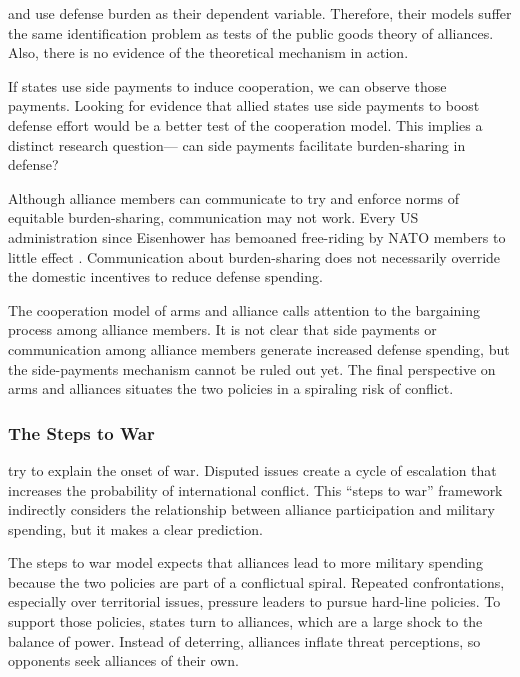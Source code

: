 \documentclass[12pt]{article}
\begin{document}
\citet{Palmer1990} and \citet{QuirozFlores2011} use defense burden as their dependent variable.
Therefore, their models suffer the same identification problem as tests of the public goods theory of alliances. 
Also, there is no evidence of the theoretical mechanism in action. 

If states use side payments to induce cooperation, we can observe those payments. 
Looking for evidence that allied states use side payments to boost defense effort would be a better test of the cooperation model. 
This implies a distinct research question--- can side payments facilitate burden-sharing in defense? 


Although alliance members can communicate to try and enforce norms of equitable burden-sharing, communication may not work.  
Every US administration since Eisenhower has bemoaned free-riding by NATO members to little effect \citep{Lanoszka2015}. 
Communication about burden-sharing does not necessarily override the domestic incentives to reduce defense spending. 



The cooperation model of arms and alliance calls attention to the bargaining process among alliance members. 
It is not clear that side payments or communication among alliance members generate increased defense spending, but the side-payments mechanism cannot be ruled out yet. 
The final perspective on arms and alliances situates the two policies in a spiraling risk of conflict.


\subsubsection{The Steps to War}


\citet{SeneseVasquez2008} try to explain the onset of war. 
Disputed issues create a cycle of escalation that increases the probability of international conflict. 
This ``steps to war'' framework  indirectly considers the relationship between alliance participation and military spending, but it makes a clear prediction. 


The steps to war model expects that alliances lead to more military spending because the two policies are part of a conflictual spiral. 
Repeated confrontations, especially over territorial issues, pressure leaders to pursue hard-line policies. 
To support those policies, states turn to alliances, which are a large shock to the balance of power. 
Instead of deterring, alliances inflate threat perceptions, so opponents seek alliances of their own. 
\end{document}

